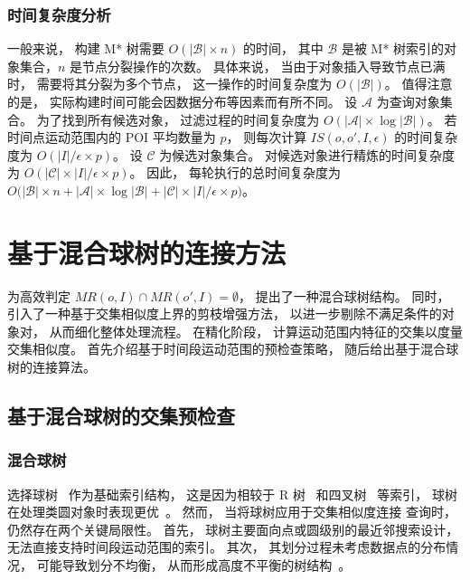     \subsubsection*{时间复杂度分析}

    一般来说， 构建 M* 树需要 $O(|\mathcal{B}|\times n)$ 的时间， 其中 $\mathcal{B}$ 是被 M* 树索引的对象集合，$n$ 是节点分裂操作的次数。 具体来说， 当由于对象插入导致节点已满时， 需要将其分裂为多个节点， 这一操作的时间复杂度为 $O(|\mathcal{B}|)$。 值得注意的是， 实际构建时间可能会因数据分布等因素而有所不同。 设 $\mathcal{A}$ 为查询对象集合。 为了找到所有候选对象， 过滤过程的时间复杂度为 $O(|\mathcal{A}|\times\log|\mathcal{B}|)$。 若时间点运动范围内的 POI 平均数量为 $p$， 则每次计算 $IS(o,o',I,\epsilon)$ 的时间复杂度为 $O(|I|/\epsilon \times p)$。 设 $\mathcal{C}$ 为候选对象集合。 对候选对象进行精炼的时间复杂度为 $O(|\mathcal{C}|\times |I|/\epsilon \times p)$。
    因此， 每轮执行的总时间复杂度为
    $
    O\big(|\mathcal{B}|\times n + |\mathcal{A}|\times\log|\mathcal{B}| + |\mathcal{C}|\times |I|/\epsilon \times p\big)
    $。



\section{基于混合球树的连接方法}

为高效判定 $MR(o,I)\cap MR(o',I)=\emptyset$， 提出了一种混合球树结构。 同时， 引入了一种基于交集相似度上界的剪枝增强方法， 以进一步剔除不满足条件的对象对， 从而细化整体处理流程。 在精化阶段， 计算运动范围内特征的交集以度量交集相似度。 首先介绍基于时间段运动范围的预检查策略， 随后给出基于混合球树的连接算法。


\subsection{基于混合球树的交集预检查}

\subsubsection*{混合球树}
\label{sec:hballtree}
选择球树~ 作为基础索引结构， 这是因为相较于 R 树~ 和四叉树~ 等索引， 球树在处理类圆对象时表现更优~。 然而， 当将球树应用于交集相似度连接 查询时， 仍然存在两个关键局限性。 首先， 球树主要面向点或圆级别的最近邻搜索设计， 无法直接支持时间段运动范围的索引。 其次， 其划分过程未考虑数据点的分布情况， 可能导致划分不均衡， 从而形成高度不平衡的树结构~。

